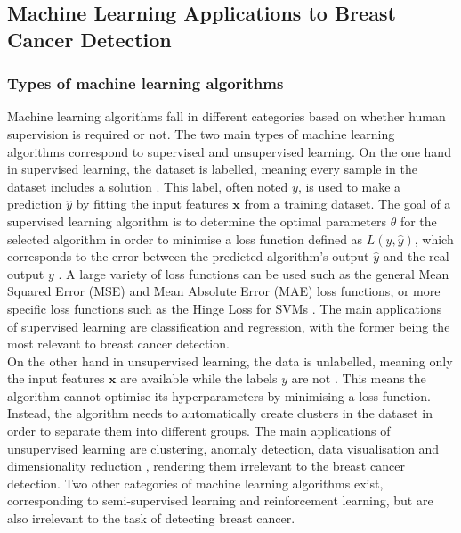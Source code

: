 \subsection{Machine Learning Applications to Breast Cancer Detection}

\subsubsection{Types of machine learning algorithms}

Machine learning algorithms fall in different categories based on whether human supervision is required or not. The two main types of machine learning algorithms correspond to supervised and unsupervised learning. On the one hand in supervised learning, the dataset is labelled, meaning every sample in the dataset includes a solution \citep{Geron2019}. This label, often noted $y$, is used to make a prediction $\hat{y}$ by fitting the input features $\textbf{x}$ from a training dataset. The goal of a supervised learning algorithm is to determine the optimal parameters $\theta$ for the selected algorithm in order to minimise a loss function defined as $L(y,\hat{y})$, which corresponds to the error between the predicted algorithm's output $\hat{y}$ and the real output $y$ \citep{Litjens2017}. A large variety of loss functions can be used such as the general Mean Squared Error (MSE) and Mean Absolute Error (MAE) loss functions, or more specific loss functions such as the Hinge Loss for SVMs \citep{Geron2019}. The main applications of supervised learning are classification and regression, with the former being the most relevant to breast cancer detection.\\

On the other hand in unsupervised learning, the data is unlabelled, meaning only the input features $\textbf{x}$ are available while the labels $y$ are not \citep{Litjens2017}. This means the algorithm cannot optimise its hyperparameters by minimising a loss function. Instead, the algorithm needs to automatically create clusters in the dataset in order to separate them into different groups. The main applications of unsupervised learning are clustering, anomaly detection, data visualisation and dimensionality reduction \citep{Geron2019}, rendering them irrelevant to the breast cancer detection. Two other categories of machine learning algorithms exist, corresponding to semi-supervised learning and reinforcement learning, but are also irrelevant to the task of detecting breast cancer.\\

